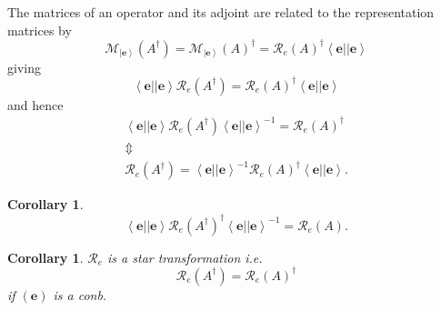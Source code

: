 \documentclass[aps,preprint]{revtex4}%
\newtheorem{corollary}[theorem]{Corollary}
\begin{document}
The matrices of an operator and its adjoint are related to the representation
matrices by
\begin{equation}
\mathcal{M}_{\left\vert \mathbf{e}\right\rangle }\left(  A^{\dagger}\right)
=\mathcal{M}_{\left\vert \mathbf{e}\right\rangle }\left(  A\right)  ^{\dagger
}=\mathcal{R}_{e}\left(  A\right)  ^{\dagger}\left\langle \mathbf{e}%
\right\vert \left\vert \mathbf{e}\right\rangle
\end{equation}
giving
\begin{equation}
\left\langle \mathbf{e}\right\vert \left\vert \mathbf{e}\right\rangle
\mathcal{R}_{e}\left(  A^{\dagger}\right)  =\mathcal{R}_{e}\left(  A\right)
^{\dagger}\left\langle \mathbf{e}\right\vert \left\vert \mathbf{e}%
\right\rangle
\end{equation}
and hence%
\begin{gather}
\left\langle \mathbf{e}\right\vert \left\vert \mathbf{e}\right\rangle
\mathcal{R}_{e}\left(  A^{\dagger}\right)  \left\langle \mathbf{e}\right\vert
\left\vert \mathbf{e}\right\rangle ^{-1}=\mathcal{R}_{e}\left(  A\right)
^{\dagger}\\
\Updownarrow\\
\mathcal{R}_{e}\left(  A^{\dagger}\right)  =\left\langle \mathbf{e}\right\vert
\left\vert \mathbf{e}\right\rangle ^{-1}\mathcal{R}_{e}\left(  A\right)
^{\dagger}\left\langle \mathbf{e}\right\vert \left\vert \mathbf{e}%
\right\rangle .
\end{gather}


\begin{corollary}%
\begin{equation}
\left\langle \mathbf{e}\right\vert \left\vert \mathbf{e}\right\rangle
\mathcal{R}_{e}\left(  A^{\dagger}\right)  ^{\dagger}\left\langle
\mathbf{e}\right\vert \left\vert \mathbf{e}\right\rangle ^{-1}=\mathcal{R}%
_{e}\left(  A\right)  .
\end{equation}

\end{corollary}

\begin{corollary}
$\mathcal{R}_{e}$ is a star transformation i.e.
\begin{equation}
\mathcal{R}_{e}\left(  A^{\dagger}\right)  =\mathcal{R}_{e}\left(  A\right)
^{\dagger}%
\end{equation}
if $\left(  \mathbf{e}\right)  $ is a conb.
\end{corollary}
\end{document}
